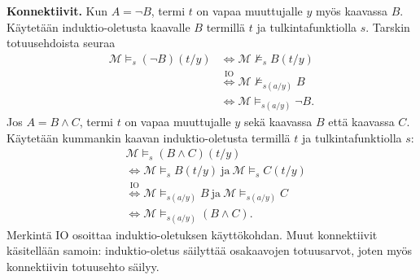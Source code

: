 \documentclass[11pt,a4paper]{amsart}
\begin{document}
\begin{solution}
  \textbf{Konnektiivit.} Kun \(A=\neg B\), termi \(t\) on vapaa
  muuttujalle \(y\) myös kaavassa \(B\). Käytetään induktio-oletusta
  kaavalle \(B\) termillä \(t\) ja tulkintafunktiolla \(s\).
  Tarskin totuusehdoista seuraa
  \[
    \begin{aligned}
      \mathcal M\models_s(\neg B)(t/y)
      &\iff \mathcal M\not\models_s B(t/y)\\
      &\overset{\text{IO}}{\iff} \mathcal M\not\models_{s(a/y)}B\\
      &\iff \mathcal M\models_{s(a/y)}\neg B.
    \end{aligned}
  \]
  Jos \(A=B\land C\), termi \(t\) on vapaa muuttujalle \(y\)
  sekä kaavassa \(B\) että kaavassa \(C\). Käytetään kummankin
  kaavan induktio-oletusta termillä \(t\) ja tulkintafunktiolla \(s\):
  \[
    \begin{aligned}
      &\mathcal M\models_s(B\land C)(t/y)\\
      &\iff \mathcal M\models_s B(t/y)\ \text{ja}\
      \mathcal M\models_s C(t/y)\\
      &\overset{\text{IO}}{\iff} \mathcal M\models_{s(a/y)}B\ \text{ja}\
      \mathcal M\models_{s(a/y)}C\\
      &\iff \mathcal M\models_{s(a/y)}(B\land C).
    \end{aligned}
  \]
  Merkintä IO osoittaa induktio-oletuksen käyttökohdan.
  Muut konnektiivit käsitellään samoin: induktio-oletus säilyttää
  osakaavojen totuusarvot, joten myös konnektiivin totuusehto säilyy.


\end{solution}
\end{document}
